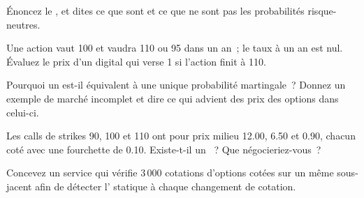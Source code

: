 \begin{interviewq}\label{iq:dv:no-arbitrage-and-the-fundamental-theorems:2}
Énoncez le , et dites ce que sont et ce que ne sont pas les
probabilités risque-neutres.
\end{interviewq}

\begin{interviewq}\label{iq:dv:no-arbitrage-and-the-fundamental-theorems:3}
Une action vaut 100 et vaudra 110 ou 95 dans un an~; le taux à un an est
nul. Évaluez le prix d'un digital qui verse 1 si l'action finit à 110.
\end{interviewq}

\begin{interviewq}\label{iq:dv:no-arbitrage-and-the-fundamental-theorems:4}
Pourquoi un  est-il équivalent à une unique probabilité martingale~? Donnez un
exemple de marché incomplet et dire ce qui advient des prix des options dans celui-ci.
\end{interviewq}

\begin{interviewq}\label{iq:dv:no-arbitrage-and-the-fundamental-theorems:5}
Les calls de strikes 90, 100 et 110 ont pour prix milieu 12.00, 6.50 et 0.90,
chacun coté avec une fourchette de 0.10. Existe-t-il un ~? Que négocieriez-vous~?
\end{interviewq}

\begin{interviewq}\label{iq:dv:no-arbitrage-and-the-fundamental-theorems:6}
Concevez un service qui vérifie 3\,000 cotations d'options cotées sur un même
sous-jacent afin de détecter l' statique à chaque changement de cotation.
\end{interviewq}
